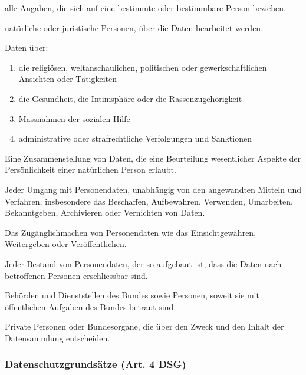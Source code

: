 \begin{description}
	\tightlist
	\item[Personendaten (Daten)] alle Angaben, die sich auf eine bestimmte oder
	bestimmbare Person beziehen.
	\item[betroffene Personen]  natürliche oder juristische Personen, über die
	Daten bearbeitet werden.
	\item[besonders schützenswerte Personendaten] Daten über:
	\begin{enumerate}
		\tightlist
		\item die religiösen, weltanschaulichen, politischen oder
		gewerkschaftlichen Ansichten oder Tätigkeiten
		\item die Gesundheit, die Intimsphäre oder die Rassenzugehörigkeit
		\item Massnahmen der sozialen Hilfe
		\item administrative oder strafrechtliche Verfolgungen und Sanktionen
	\end{enumerate}
	\item[Persönlichkeitsprofil] Eine Zusammenstellung von Daten, die eine
	Beurteilung wesentlicher Aspekte der Persönlichkeit einer natürlichen Person
	erlaubt.
	\item[Bearbeiten] Jeder Umgang mit Personendaten, unabhängig von den
	angewandten Mitteln und Verfahren, insbesondere das Beschaffen,
	Aufbewahren, Verwenden, Umarbeiten, Bekanntgeben, Archivieren oder
	Vernichten von Daten.
	\item[Bekanntgeben] Das Zugänglichmachen von Personendaten wie das
	Einsichtgewähren, Weitergeben oder Veröffentlichen.
	\item[Datensammlung] Jeder Bestand von Personendaten, der so
	aufgebaut ist, dass die Daten nach betroffenen Personen erschliessbar
	sind.
	\item[Bundesorgane]  Behörden und Dienststellen des Bundes sowie
	Personen, soweit sie mit öffentlichen Aufgaben des Bundes betraut sind.
	\item[Inhaber der Datensammlung] Private Personen oder Bundesorgane,
	die über den Zweck und den Inhalt der Datensammlung entscheiden.
\end{description}


\subsubsection{Datenschutzgrundsätze (Art. 4 DSG)}
\label{sec:Datenschutz-Datenschutzgrundsätze}

